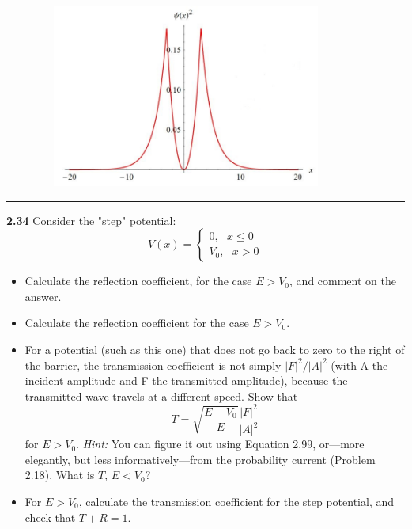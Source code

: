 \documentclass[fleqn]{article}
\begin{document}
{      \\
      \\
      \includegraphics[height=6cm, width=12cm]{3.JPG}
    }

  \rule{15cm}{1pt}

  \textbf{2.34}
  Consider the "step" potential: 
  $$V(x)=\begin{cases}
    0, ~~~ x\leqslant 0 \\
    V_0, ~~~ x > 0
  \end{cases}$$
  \begin{itemize}
    \item Calculate the reflection coefficient, for the case $E>V_0$, and comment on the answer.

    \item Calculate the reflection coefficient for the case $E>V_0$.

    \item For a potential (such as this one) that does not go back to zero to the right of the barrier,
    the transmission coefficient is not simply $|F|^2/|A|^2$ (with A the incident amplitude and F
    the transmitted amplitude), because the transmitted wave travels at a different speed. Show
    that
    $$T=\sqrt{\dfrac{E-V_0}{E}}\dfrac{|F|^2}{|A|^2}$$
    for $E>V_0$. \emph{Hint:} You can figure it out using Equation 2.99, or—more elegantly, but less
    informatively—from the probability current (Problem 2.18). What is $T$, $E<V_0?$

    \item For $E>V_0$, calculate the transmission coefficient for the step potential, and check that $T+R=1$.
    
  \end{itemize}
\end{document}
